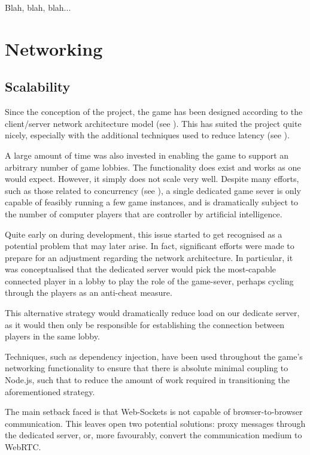 \documentclass{standalone}
\begin{document}
		Blah, blah, blah...

	\section{Networking}

		\subsection{Scalability}
			Since the conception of the project, the game has been designed according to the client/server network architecture model (see ). This has suited the project quite nicely, especially with the additional techniques used to reduce latency (see ).

			A large amount of time was also invested in enabling the game to support an arbitrary number of game lobbies. The functionality does exist and works as one would expect. However, it simply does not scale very well. Despite many efforts, such as those related to concurrency (see ), a single dedicated game sever is only capable of feasibly running a few game instances, and is dramatically subject to the number of computer players that are controller by artificial intelligence.

			Quite early on during development, this issue started to get recognised as a potential problem that may later arise. In fact, significant efforts were made to prepare for an adjustment regarding the network architecture. In particular, it was conceptualised that the dedicated server would pick the most-capable connected player in a lobby to play the role of the game-sever, perhaps cycling through the players as an anti-cheat measure.

			This alternative strategy would dramatically reduce load on our dedicate server, as it would then only be responsible for establishing the connection between players in the same lobby.

			Techniques, such as dependency injection, have been used throughout the game's networking functionality to ensure that there is absolute minimal coupling to Node.js, such that to reduce the amount of work required in transitioning the aforementioned strategy.

			The main setback faced is that Web-Sockets is not capable of browser-to-browser communication. This leaves open two potential solutions: proxy messages through the dedicated server, or, more favourably, convert the communication medium to WebRTC.
\end{document}
